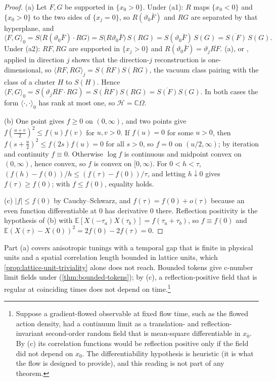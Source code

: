\documentclass[11pt,a4paper]{amsart}
\theoremstyle{definition}
\theoremstyle{remark}
\numberwithin{equation}{section}
\newcommand{\C}{\mathbb{C}}          %
\newcommand{\Hilb}{\mathcal{H}}      %
\newcommand{\ip}[2]{\langle #1,#2\rangle}  %
\newcommand{\abs}[1]{\lvert #1\rvert}      %
\newcommand{\hypW}{\text{\upshape(W)}}              %
\begin{document}
\begin{proof}
(a) Let $F,G$ be supported in $\{x_0>0\}$. Under (a1): $R$ maps $\{x_0<0\}$ and $\{x_0>0\}$ to the two sides of $\{x_j=0\}$, so $R(\vartheta_0\bar F)$ and $RG$ are separated by that hyperplane, and
\[
\ip FG_0=S\bigl(R(\vartheta_0\bar F)\cdot RG\bigr)=S\bigl(R\vartheta_0\bar F\bigr)\,S(RG)=S(\vartheta_0\bar F)\,S(G)=\overline{S(F)}\,S(G).
\]
Under (a2): $RF,RG$ are supported in $\{x_j>0\}$ and $R(\vartheta_0\bar F)=\vartheta_j\overline{RF}$. (a), or \cite[Lemma~A32]{bhattacharjee2026first}, applied in direction $j$ shows that the direction-$j$ reconstruction is one-dimensional, so $\ip{RF}{RG}_j=\overline{S(RF)}S(RG)$, the vacuum class pairing with the class of a cluster $H$ to $S(H)$. Hence $\ip FG_0=S(\vartheta_j\overline{RF}\cdot RG)=\overline{S(RF)}S(RG)=\overline{S(F)}S(G)$. In both cases the form $\ip\cdot\cdot_0$ has rank at most one, so $\Hilb=\C\Omega$.

(b) One point gives $f\ge0$ on $(0,\infty)$, and two points give $f(\frac{u+v}2)^2\le f(u)f(v)$ for $u,v>0$. If $f(u)=0$ for some $u>0$, then $f(s+\frac u2)^2\le f(2s)f(u)=0$ for all $s>0$, so $f=0$ on $(u/2,\infty)$; by iteration and continuity $f\equiv0$. Otherwise $\log f$ is continuous and midpoint convex on $(0,\infty)$, hence convex, so $f$ is convex on $[0,\infty)$. For $0<h<\tau$, $(f(h)-f(0))/h\le(f(\tau)-f(0))/\tau$, and letting $h\downarrow0$ gives $f(\tau)\ge f(0)$; with $f\le f(0)$, equality holds.

(c) $\abs f\le f(0)$ by Cauchy--Schwarz, and $f(\tau)=f(0)+o(\tau)$ because an even function differentiable at $0$ has derivative $0$ there. Reflection positivity is the hypothesis of (b) with $\mathbb E[X(-\tau_a)X(\tau_b)]=f(\tau_a+\tau_b)$, so $f\equiv f(0)$ and $\mathbb E(X(\tau)-X(0))^2=2f(0)-2f(\tau)=0$.
\end{proof}

Part (a) covers anisotropic tunings with a temporal gap that is finite in physical units and a spatial correlation length bounded in lattice units, which \cref{prop:lattice-unit-triviality} alone does not reach. Bounded tokens give c-number limit fields under \hypW{} (\cref{thm:bounded-tokens}); by (c), a reflection-positive field that is regular at coinciding times does not depend on time.\footnote{Suppose a gradient-flowed observable at fixed flow time, such as the flowed action density, had a continuum limit as a translation- and reflection-invariant second-order random field that is mean-square differentiable in $x_0$. By (c) its correlation functions would be reflection positive only if the field did not depend on $x_0$. The differentiability hypothesis is heuristic (it is what the flow is designed to provide), and this reading is not part of any theorem.}
\end{document}
